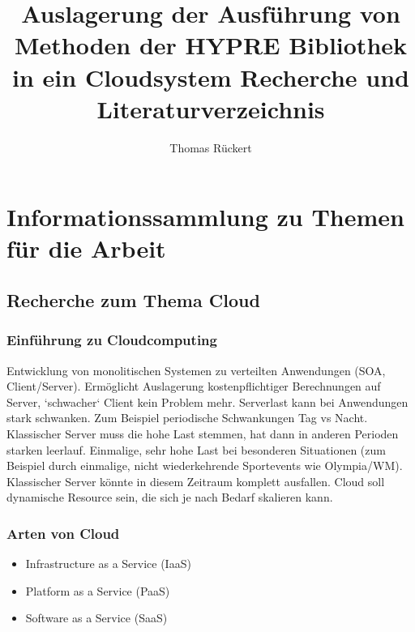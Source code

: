\documentclass[a4paper,10pt]{article}
\title{Auslagerung der Ausführung von Methoden der HYPRE Bibliothek in ein Cloudsystem
Recherche und Literaturverzeichnis}
\author{Thomas Rückert}
\begin{document}
\maketitle
\newpage

\begin{abstract}

\end{abstract}

\newpage

\tableofcontents

\newpage

\section{Informationssammlung zu Themen für die Arbeit}

\subsection{Recherche zum Thema Cloud}

\subsubsection{Einführung zu Cloudcomputing}

Entwicklung von monolitischen Systemen zu verteilten Anwendungen (SOA, Client/Server).
Ermöglicht Auslagerung kostenpflichtiger Berechnungen auf Server, `schwacher` Client kein Problem mehr.
Serverlast kann bei Anwendungen stark schwanken.
Zum Beispiel periodische Schwankungen Tag vs Nacht.
Klassischer Server muss die hohe Last stemmen, hat dann in anderen Perioden starken leerlauf.
Einmalige, sehr hohe Last bei besonderen Situationen (zum Beispiel durch einmalige, nicht wiederkehrende Sportevents wie Olympia/WM).
Klassischer Server könnte in diesem Zeitraum komplett ausfallen.
Cloud soll dynamische Resource sein, die sich je nach Bedarf skalieren kann.

\subsubsection{Arten von Cloud}

\begin{itemize}
 \item Infrastructure as a Service (IaaS)
 \item Platform as a Service (PaaS)
 \item Software as a Service (SaaS)
\end{itemize}
\end{document}
